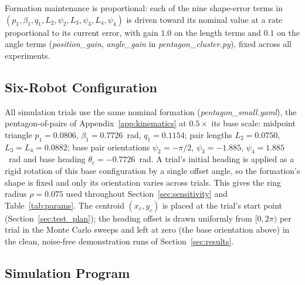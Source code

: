 \documentclass[lettersize,journal]{IEEEtran}
\begin{document}
Formation maintenance is proportional: each of the nine shape-error
terms in $(p_1, \beta_1, q_1, L_2, \psi_2, L_3, \psi_3, L_4, \psi_4)$ is
driven toward its nominal value at a rate proportional to its current
error, with gain $1.0$ on the length terms and $0.1$ on the angle terms
(\textit{position\_gain}, \textit{angle\_gain} in
\textit{pentagon\_cluster.py}), fixed across all experiments.

\subsection{Six-Robot Configuration}

All simulation trials use the same nominal formation
(\textit{pentagon\_small.yaml}), the pentagon-of-pairs of
Appendix~\ref{app:kinematics} at $0.5\times$ its base scale: midpoint
triangle $p_1 = 0.0806$, $\beta_1 = 0.7726$~rad, $q_1 = 0.1154$; pair
lengths $L_2 = 0.0750$, $L_3 = L_4 = 0.0882$; base pair orientations
$\psi_2 = -\pi/2$, $\psi_3 = -1.885$, $\psi_4 = 1.885$~rad and base
heading $\theta_c = -0.7726$~rad. A trial's initial heading is applied
as a rigid rotation of this base configuration by a single offset
angle, so the formation's shape is fixed and only its orientation
varies across trials. This gives the ring radius $\rho = 0.075$ used
throughout Section~\ref{sec:sensitivity} and Table~\ref{tab:params}.
The centroid $(x_c, y_c)$ is placed at the trial's start point
(Section~\ref{sec:test_plan}); the heading offset is drawn uniformly
from $[0, 2\pi)$ per trial in the Monte Carlo sweeps and left at zero
(the base orientation above) in the clean, noise-free demonstration
runs of Section~\ref{sec:results}.

\subsection{Simulation Program}
\end{document}
